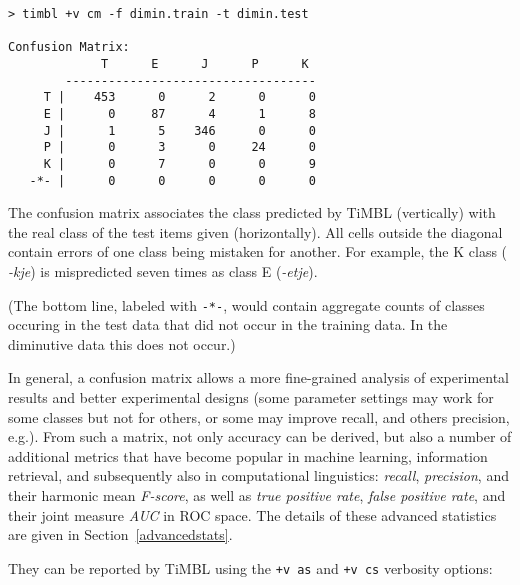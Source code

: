 \documentclass{book}
\begin{document}
{\footnotesize
\begin{verbatim}
> timbl +v cm -f dimin.train -t dimin.test

Confusion Matrix:
             T      E      J      P      K 
        -----------------------------------
     T |    453      0      2      0      0 
     E |      0     87      4      1      8 
     J |      1      5    346      0      0 
     P |      0      3      0     24      0 
     K |      0      7      0      0      9 
   -*- |      0      0      0      0      0 

\end{verbatim}
}

The confusion matrix associates the class predicted by TiMBL
(vertically) with the real class of the test items given
(horizontally). All cells outside the diagonal contain errors of one
class being mistaken for another. For example, the K class ({\em
  -kje}) is mispredicted seven times as class E ({\em -etje}).

(The bottom line, labeled with {\tt -*-}, would contain aggregate
counts of classes occuring in the test data that did not occur in the
training data. In the diminutive data this does not occur.)

In general, a confusion matrix allows a more fine-grained analysis of
experimental results and better experimental designs (some parameter
settings may work for some classes but not for others, or some may
improve recall, and others precision, e.g.). From such a matrix, not
only accuracy can be derived, but also a number of additional metrics
that have become popular in machine learning, information retrieval,
and subsequently also in computational linguistics: {\em recall},
{\em precision}, and their harmonic mean {\em F-score}, as well as {\em true
  positive rate}, {\em false positive rate}, and their joint measure
{\em AUC} in ROC space.  The details of these advanced statistics are
given in Section~\ref{advancedstats}.

They can be reported by TiMBL using the {\tt +v as} and {\tt +v cs}
verbosity options:
\end{document}
